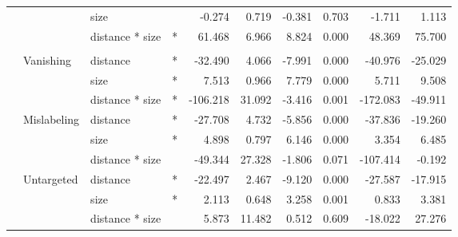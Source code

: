\documentclass[
]{article}
\begin{document}
\begin{longtable}[t]{llllrrrrrr}
\cmidrule{3-10}\nopagebreak
\hspace{1em} &  & size &  & -0.274 & 0.719 & -0.381 & 0.703 & -1.711 & 1.113\\
\cmidrule{3-10}\nopagebreak
\hspace{1em} &  & distance * size & * & 61.468 & 6.966 & 8.824 & 0.000 & 48.369 & 75.700\\
\cmidrule{1-10}\pagebreak[0]
\addlinespace[0.3em]
\multicolumn{10}{l}{\textbf{Cascade R-CNN}}\\
\hspace{1em} & Vanishing & distance & * & -32.490 & 4.066 & -7.991 & 0.000 & -40.976 & -25.029\\
\cmidrule{3-10}\nopagebreak
\hspace{1em} &  & size & * & 7.513 & 0.966 & 7.779 & 0.000 & 5.711 & 9.508\\
\cmidrule{3-10}\nopagebreak
\hspace{1em} &  & distance * size & * & -106.218 & 31.092 & -3.416 & 0.001 & -172.083 & -49.911\\
\cmidrule{2-10}\nopagebreak
\hspace{1em} & Mislabeling & distance & * & -27.708 & 4.732 & -5.856 & 0.000 & -37.836 & -19.260\\
\cmidrule{3-10}\nopagebreak
\hspace{1em} &  & size & * & 4.898 & 0.797 & 6.146 & 0.000 & 3.354 & 6.485\\
\cmidrule{3-10}\nopagebreak
\hspace{1em} &  & distance * size &  & -49.344 & 27.328 & -1.806 & 0.071 & -107.414 & -0.192\\
\cmidrule{2-10}\nopagebreak
\hspace{1em} & Untargeted & distance & * & -22.497 & 2.467 & -9.120 & 0.000 & -27.587 & -17.915\\
\cmidrule{3-10}\nopagebreak
\hspace{1em} &  & size & * & 2.113 & 0.648 & 3.258 & 0.001 & 0.833 & 3.381\\
\cmidrule{3-10}\nopagebreak
\hspace{1em} &  & distance * size &  & 5.873 & 11.482 & 0.512 & 0.609 & -18.022 & 27.276\\
\bottomrule
\end{longtable}
\endgroup{}
\end{document}
